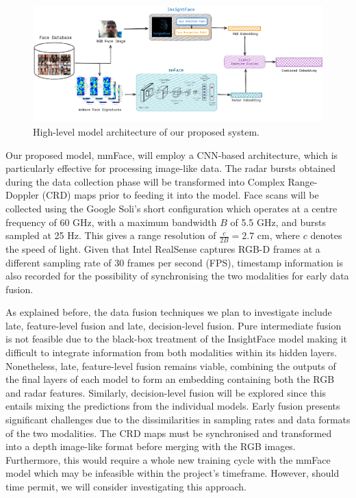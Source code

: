 \documentclass{interim}
\begin{document}
\begin{figure}[h!]
    \vspace{-0.4cm}
    \centering
    \includegraphics[width=1\textwidth]{images/model_architecture.pdf}
    \vspace{-1.1cm}
    \caption{High-level model architecture of our proposed system.}
    \vspace{-2cm}
    \label{fig:model_architecture}
\end{figure}

\newpage
Our proposed model, mmFace, will employ a CNN-based architecture, which is particularly effective for processing image-like data. The radar bursts obtained during the data collection phase will be transformed into Complex Range-Doppler (CRD) maps \cite{lien2016soli,hayashi2021radarnet} prior to feeding it into the model. Face scans will be collected using the Google Soli's short configuration which operates at a centre frequency of 60 GHz, with a maximum bandwidth $B$ of 5.5 GHz, and bursts sampled at 25 Hz. This gives a range resolution of $\frac{c}{2B} = 2.7$ cm, where $c$ denotes the speed of light. Given that Intel RealSense captures RGB-D frames at a different sampling rate of 30 frames per second (FPS), timestamp information is also recorded for the possibility of synchronising the two modalities for early data fusion.

As explained before, the data fusion techniques we plan to investigate include late, feature-level fusion and late, decision-level fusion. Pure intermediate fusion is not feasible due to the black-box treatment of the InsightFace model making it difficult to integrate information from both modalities within its hidden layers. Nonetheless, late, feature-level fusion remains viable, combining the outputs of the final layers of each model to form an embedding containing both the RGB and radar features. Similarly, decision-level fusion will be explored since this entails mixing the predictions from the individual models. Early fusion presents significant challenges due to the dissimilarities in sampling rates and data formats of the two modalities. The CRD maps must be synchronised and transformed into a depth image-like format before merging with the RGB images. Furthermore, this would require a whole new training cycle with the mmFace model which may be infeasible within the project's timeframe. However, should time permit, we will consider investigating this approach.
\end{document}
